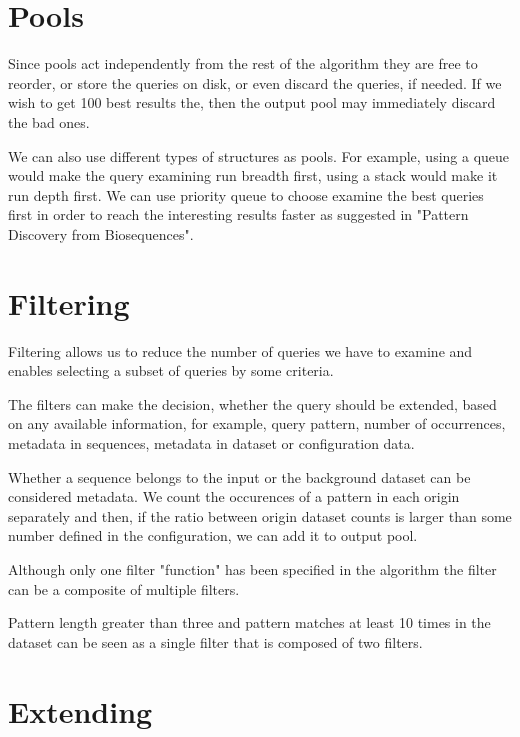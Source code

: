\section{Pools}

Since pools act independently from the rest of the algorithm they are free to reorder, or store the queries on disk, or even discard the queries, if needed. If we wish to get 100 best results the, then the output pool may immediately discard the bad ones.

We can also use different types of structures as pools. For example, using a queue would make the query examining run breadth first, using a stack would make it run depth first. We can use priority queue to choose examine the best queries first in order to reach the interesting results faster as suggested in "Pattern Discovery from Biosequences"\cite{spexs}.

\section{Filtering}

Filtering allows us to reduce the number of queries we have to examine and enables selecting a subset of queries by some criteria.

The filters can make the decision, whether the query should be extended, based on any available information, for example, query pattern, number of occurrences, metadata in sequences, metadata in dataset or configuration data.

\begin{exmp}
Whether a sequence belongs to the input or the background dataset can be considered metadata. We count the occurences of a pattern in each origin separately and then, if the ratio between origin dataset counts is larger than some number defined in the configuration, we can add it to output pool.
\end{exmp}

Although only one filter "function" has been specified in the algorithm the filter can be a composite of multiple filters.

\begin{exmp}
Pattern length greater than three and pattern matches at least 10 times in the dataset can be seen as a single filter that is composed of two filters.
\end{exmp}

\section{Extending}

